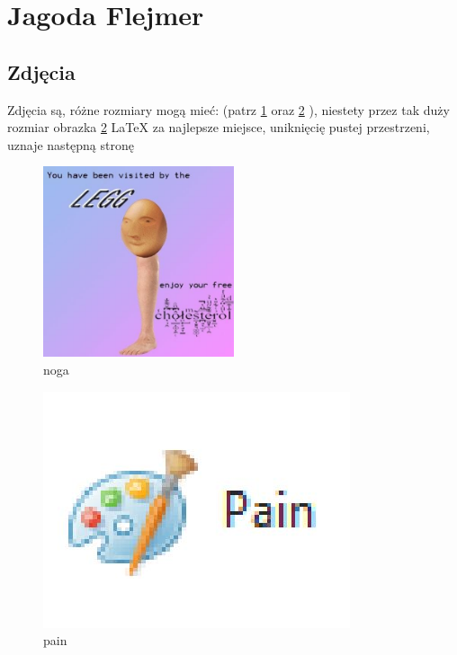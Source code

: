 \section{Jagoda Flejmer}
\label{sec:jagoda_flejmer}
%

\subsection{Zdjęcia}
Zdjęcia są, różne rozmiary mogą mieć: (patrz \ref{fig:noga} oraz \ref{fig:pain} ), niestety przez tak duży rozmiar obrazka \ref{fig:pain} LaTeX za najlepsze miejsce, uniknięcię pustej przestrzeni, uznaje następną stronę\\
                \begin{figure}[htbp] %
                    \centering
                    \includegraphics[width = 0.5\textwidth]{pictures/legg.jpg}
                    \caption{noga}
                    \label{fig:noga}
                \end{figure}
                \begin{figure}[htbp] 
                    \centering
                    \includegraphics[width = \textwidth, scale = 2]{pictures/pain.jpg} %
                    \caption{pain}
                    \label{fig:pain}
                \end{figure}
\newpage

